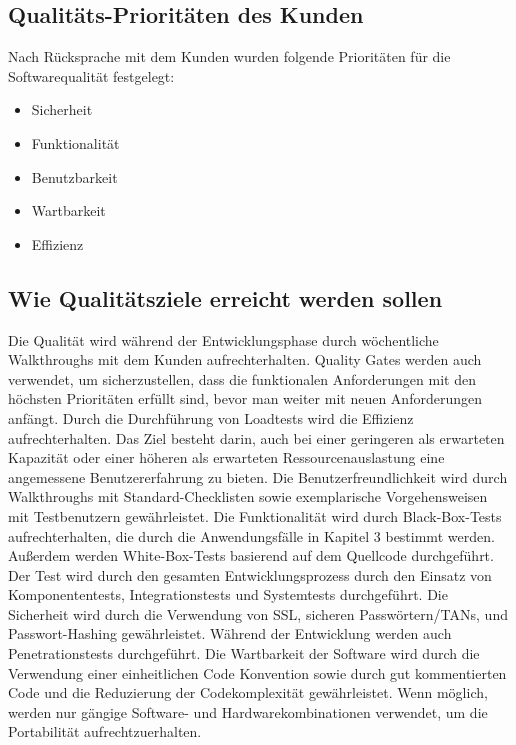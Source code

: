 	\subsection{Qualitäts-Prioritäten des Kunden}
		
    Nach Rücksprache mit dem Kunden wurden folgende Prioritäten für die Softwarequalität festgelegt:

		\begin{itemize}
			\item Sicherheit 
            \item Funktionalität
           	\item Benutzbarkeit
            \item Wartbarkeit
            \item Effizienz

		\end{itemize}

	\subsection{Wie Qualitätsziele erreicht werden sollen}
	
	Die Qualität wird während der Entwicklungsphase durch wöchentliche Walkthroughs mit dem Kunden aufrechterhalten. Quality Gates werden auch verwendet, um sicherzustellen, dass die funktionalen Anforderungen mit den höchsten Prioritäten erfüllt sind, bevor man weiter mit neuen Anforderungen anfängt.
	\linebreak
    Durch die Durchführung von Loadtests wird die Effizienz aufrechterhalten. Das Ziel besteht darin, auch bei einer geringeren als erwarteten Kapazität oder einer höheren als erwarteten Ressourcenauslastung eine angemessene Benutzererfahrung zu bieten. 
	\linebreak
	Die Benutzerfreundlichkeit wird durch Walkthroughs mit Standard-Checklisten sowie exemplarische Vorgehensweisen mit Testbenutzern gewährleistet.
	\linebreak
	Die Funktionalität wird durch Black-Box-Tests aufrechterhalten, die durch die Anwendungsfälle in Kapitel 3 bestimmt werden. Außerdem werden White-Box-Tests basierend auf dem Quellcode durchgeführt. Der Test wird durch den gesamten Entwicklungsprozess durch den Einsatz von Komponententests, Integrationstests und Systemtests durchgeführt.
	\linebreak
	Die Sicherheit wird durch die Verwendung von SSL, sicheren Passwörtern/TANs, und Passwort-Hashing gewährleistet. Während der Entwicklung werden auch Penetrationstests durchgeführt.
	\linebreak
	Die Wartbarkeit der Software wird durch die Verwendung einer einheitlichen Code Konvention sowie durch gut kommentierten Code und die Reduzierung der Codekomplexität gewährleistet.
	\linebreak
	Wenn möglich, werden nur gängige Software- und Hardwarekombinationen verwendet, um die Portabilität aufrechtzuerhalten.
